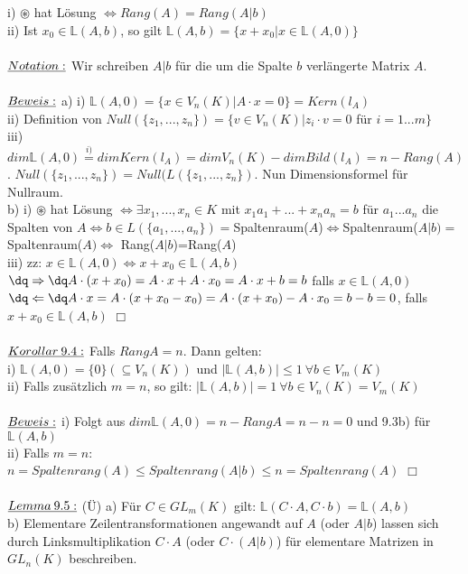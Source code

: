 \documentclass[fleqn, a4paper, 11pt]{scrartcl}
\theoremstyle{definition}
\begin{document}
i) $\circledast$ hat Lösung $\Leftrightarrow Rang(A)=Rang(A|b)$\\
ii) Ist $x_0\in\mathbb{L}(A,b)$, so gilt $\mathbb{L}(A,b)=\{x+x_0|x\in\mathbb{L}(A,0)\}$\\
\\
$\uline{Notation:}$ Wir schreiben $A|b$ für die um die Spalte $b$ verlängerte Matrix $A$.\\
\\
$\uline{Beweis:}$ a) i) $\mathbb{L}(A,0)=\{x\in V_n(K)|A\cdot x=0\}=Kern(l_A)$\\
ii) Definition von $Null(\{z_1,...,z_n\})=\{v\in V_n(K)|z_i\cdot v=0$ für $i=1...m\}$\\
iii) $dim\mathbb{L}(A,0)\stackrel{i)}{=} dim Kern(l_A)=dim V_n(K)-dim Bild(l_A)=n- Rang(A)$. $Null(\{z_1,...,z_n\})=Null(L(\{z_1,...,z_n\})$. Nun Dimensionsformel für Nullraum.\\
b) i) $\circledast$ hat Lösung $\Leftrightarrow\exists x_1,...,x_n\in K$ mit $x_1 a_1+...+x_n a_n=b$ für $a_1...a_n$ die Spalten von $A\Leftrightarrow b\in L(\{a_1,...,a_n\})=$Spaltenraum($A$)$\Leftrightarrow$Spaltenraum($A|b)=$Spaltenraum($A)\Leftrightarrow$ Rang($A|b$)=Rang($A$)\\
iii) zz: $x\in \mathbb{L}(A,0)\Leftrightarrow x+x_0\in\mathbb{L}(A,b)$\\
$\dq\Rightarrow\dq A\cdot(x+x_0)=A\cdot x+A\cdot x_0=A\cdot x+b=b$ falls $x\in\mathbb{L}(A,0)$\\
$\dq\Leftarrow\dq A\cdot x=A\cdot(x+x_0-x_0)=A\cdot(x+x_0)-A\cdot x_0=b-b=0$, falls $x+x_0\in\mathbb{L}(A,b)$ \hfill $\Box$\\
\\
$\uline{Korollar\:9.4:}$ Falls $Rang A=n$. Dann gelten:\\
i) $\mathbb{L}(A,0)=\{0\}(\subseteq V_n(K))$ und $|\mathbb{L}(A,b)|\leq 1\:\forall b\in V_m(K)$\\
ii) Falls zusätzlich $m=n$, so gilt: $|\mathbb{L}(A,b)|=1\:\forall b\in V_n(K)=V_m(K)$\\
\\
$\uline{Beweis:}$ i) Folgt aus $dim\mathbb{L}(A,0)=n-Rang A=n-n=0$ und 9.3b) für $\mathbb{L}(A,b)$\\
ii) Falls $m=n$: $n=Spaltenrang(A)\leq Spaltenrang(A|b)\leq n=Spaltenrang(A)$ \hfill $\Box$\\
\\
$\uline{Lemma\:9.5:}$ (\"U) a) Für $C\in GL_m(K)$ gilt: $\mathbb{L}(C\cdot A,C\cdot b)=\mathbb{L}(A,b)$\\
b) Elementare Zeilentransformationen angewandt auf $A$ (oder $A|b$) lassen sich durch Linksmultiplikation $C\cdot A$ (oder $C\cdot (A|b)$) für elementare Matrizen in $GL_n(K)$ beschreiben.\\
\end{document}
